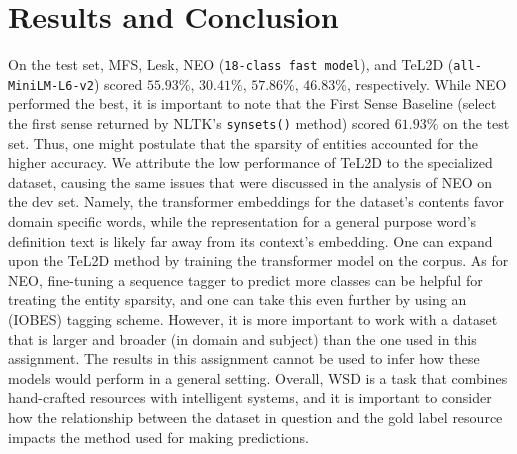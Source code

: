 \documentclass[11pt]{article}
\begin{document}
\section{Results and Conclusion}
\vspace{-1ex}
On the test set, MFS, Lesk, NEO (\texttt{18-class fast model}), and TeL2D (\texttt{all-MiniLM-L6-v2}) 
scored $55.93\%$, $30.41\%$, $57.86\%$, $46.83\%$, respectively.
While NEO performed the best, it is important to note that the First Sense Baseline (select the first sense returned by NLTK's \texttt{synsets()} method)
scored $61.93\%$ on the test set. Thus, one might postulate that the sparsity of entities 
accounted for the higher accuracy. We attribute the low performance of TeL2D to the 
specialized dataset, causing the same issues that were discussed in the analysis of NEO on the dev set.
Namely, the transformer embeddings for the dataset's contents favor domain specific words, while the representation
for a general purpose word's definition text is likely far away from its context's embedding.
One can expand upon the TeL2D method by training the transformer model on the corpus. As for NEO,
fine-tuning a sequence tagger to predict more classes can be helpful for treating the entity sparsity,
and one can take this even further by using an (IOBES) tagging scheme.
However, it is more important to work with a dataset that is larger and broader (in domain and subject) 
than the one used in this assignment. The results in this assignment cannot be used to infer 
how these models would perform in a general setting. Overall, WSD is a task that
combines hand-crafted resources with intelligent systems, and it is
important to consider how the relationship between the dataset in question
and the gold label resource impacts the method used for making predictions.

\end{document}
